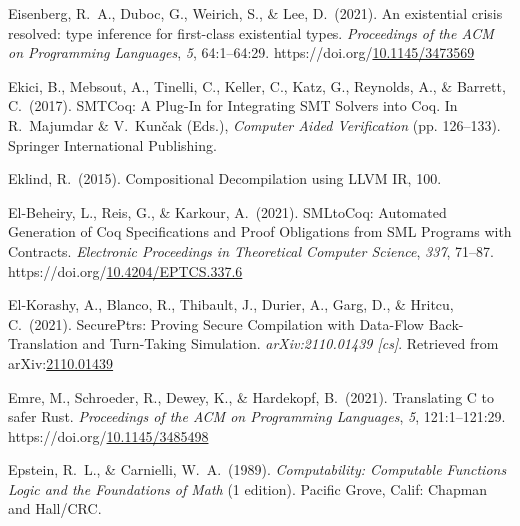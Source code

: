 \documentclass[12pt,twoside]{article}
\begin{document}
{\begin{thebibliography}{1079}
\mdbibitemlabel{}Eisenberg, R.~A., Duboc, G., Weirich, S., \& Lee, D.~(2021). An existential crisis resolved: type inference for first-class existential types. \emph{Proceedings of the ACM on Programming Languages}, \emph{5}, 64:1–64:29. https://doi.org/\href{https://dx.doi.org/10.1145/3473569}{10.1145/3473569}%

\mdbibitemlabel{}Ekici, B., Mebsout, A., Tinelli, C., Keller, C., Katz, G., Reynolds, A., \& Barrett, C.~(2017). SMTCoq: A Plug-In for Integrating SMT Solvers into Coq. In R.~Majumdar \& V.~Kunčak (Eds.), \emph{Computer Aided Verification} (pp. 126–133). Springer International Publishing.%

\mdbibitemlabel{}Eklind, R.~(2015). Compositional Decompilation using LLVM IR, 100.%

\mdbibitemlabel{}El-Beheiry, L., Reis, G., \& Karkour, A.~(2021). SMLtoCoq: Automated Generation of Coq Specifications and Proof Obligations from SML Programs with Contracts. \emph{Electronic Proceedings in Theoretical Computer Science}, \emph{337}, 71–87. https://doi.org/\href{https://dx.doi.org/10.4204/EPTCS.337.6}{10.4204/EPTCS.337.6}%

\mdbibitemlabel{}El-Korashy, A., Blanco, R., Thibault, J., Durier, A., Garg, D., \& Hritcu, C.~(2021). SecurePtrs: Proving Secure Compilation with Data-Flow Back-Translation and Turn-Taking Simulation. \emph{arXiv:2110.01439 {}[cs]}. Retrieved from arXiv:\href{http://arxiv.org/abs/2110.01439}{2110.01439}%

\mdbibitemlabel{}Emre, M., Schroeder, R., Dewey, K., \& Hardekopf, B.~(2021). Translating C to safer Rust. \emph{Proceedings of the ACM on Programming Languages}, \emph{5}, 121:1–121:29. https://doi.org/\href{https://dx.doi.org/10.1145/3485498}{10.1145/3485498}%

\mdbibitemlabel{}Epstein, R.~L., \& Carnielli, W.~A.~(1989). \emph{Computability: Computable Functions Logic and the Foundations of Math} (1 edition). Pacific Grove, Calif: Chapman and Hall/CRC.%


\end{thebibliography}}
\end{document}

